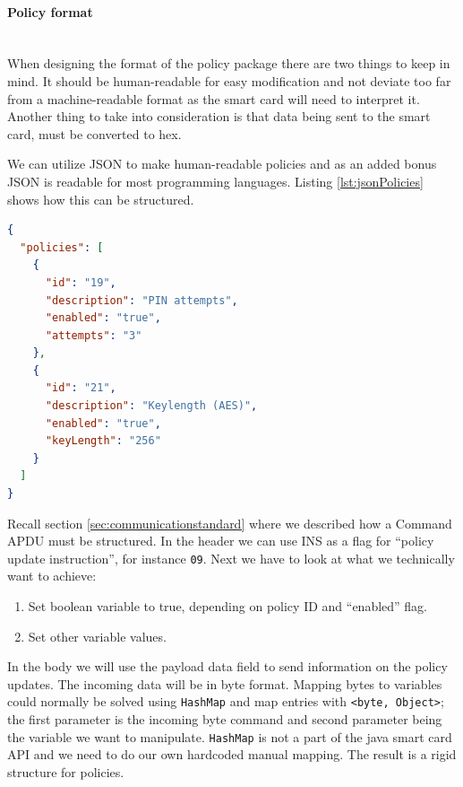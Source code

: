 \newpage

\paragraph{Policy format}\mbox{}\\
When designing the format of the policy package there are two things to keep in mind. It should be human-readable for easy modification and not deviate too far from a machine-readable format as the smart card will need to interpret it. Another thing to take into consideration is that data being sent to the smart card, must be converted to hex.

We can utilize JSON to make human-readable policies and as an added bonus JSON is readable for most programming languages. Listing \ref{lst:jsonPolicies} shows how this can be structured.
\begin{lstlisting}[language=json,firstnumber=1,caption=Human-readable policies in JSON., label=lst:jsonPolicies,]
{
  "policies": [
    {
      "id": "19",
      "description": "PIN attempts",
      "enabled": "true",
      "attempts": "3"
    },
    {
      "id": "21",
      "description": "Keylength (AES)",
      "enabled": "true",
      "keyLength": "256"
    }
  ]
}
\end{lstlisting}

Recall section \ref{sec:communicationstandard} where we described how a Command APDU must be structured. In the header we can use INS as a flag for ``policy update instruction'', for instance \texttt{09}. Next we have to look at what we technically want to achieve:
\begin{enumerate}
    \item Set boolean variable to true, depending on policy ID and ``enabled'' flag.
    \item Set other variable values.
\end{enumerate}
In the body we will use the payload data field to send information on the policy updates. The incoming data will be in byte format. Mapping bytes to variables could normally be solved using \texttt{HashMap} and map entries with \texttt{<byte, Object>}; the first parameter is the incoming byte command and second parameter being the variable we want to manipulate. \texttt{HashMap} is not a part of the java smart card API and we need to do our own hardcoded manual mapping. The result is a rigid structure for policies.

